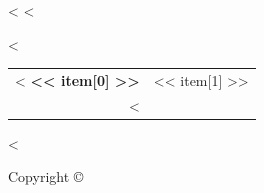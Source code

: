 <%
\clearpage
\thispagestyle{empty}
\null
<%
\clearpage
\large
\vspace*{\fill}

<%
\begin{longtable}[]{@{}rl@{}}
<%
\textbf{<< item[0] >>} & << item[1] >> \\
<%
\end{longtable}
<%

Copyright \copyright \the\year{} \theauthor

\normalsize
\newpage
\newpage
